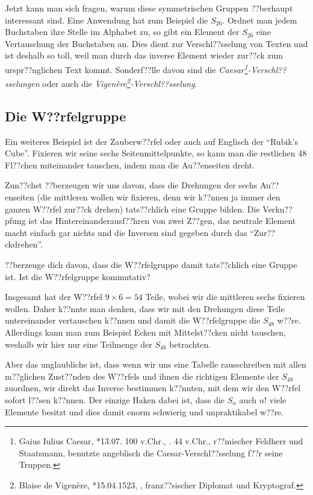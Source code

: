 \documentclass[a4paper,ngerman,12pt]{zirkelblatt1415}
\theoremstyle{definition}
\theoremstyle{plain}
\theoremstyle{remark}
\begin{document}
Jetzt kann man sich fragen, warum diese symmetrischen Gruppen ??berhaupt interessant sind. Eine Anwendung hat zum Beispiel die $S_{26}$. Ordnet man jedem Buchstaben ihre Stelle im Alphabet zu, so gibt ein Element der $S_{26}$ eine Vertauschung der Buchstaben an. Dies dient zur Verschl??sselung von Texten und ist deshalb so toll, weil man durch das inverse Element wieder zur??ck zum urspr??nglichen Text kommt. Sonderf??lle davon sind die \textit{Caesar\footnote{Gaius Iulius Caesar, *13.07. 100 v.Chr., . 44 v.Chr., r??mischer Feldherr und Staatsmann, benutzte angeblisch die Caesar-Verschl??sselung f??r seine Truppen.}-Verschl??sselungen} oder auch die \textit{Vigen\`ere\footnote{Blaise de Vigen\`ere, *15.04.1523, , franz??sischer Diplomat und Kryptograf.}-Verschl??sselung}.

\subsection{Die W??rfelgruppe}

Ein weiteres Beispiel ist der Zauberw??rfel oder auch auf Englisch der "`Rubik's Cube"'. Fixieren wir seine sechs Seitenmittelpunkte, so kann man die restlichen 48 Fl??chen miteinander tauschen, indem man die Au??enseiten dreht.

Zun??chst ??berzeugen wir uns davon, dass die Drehungen der sechs Au??enseiten (die mittleren wollen wir fixieren, denn wir k??nnen ja immer den ganzen W??rfel zur??ck drehen) tats??chlich eine Gruppe bilden. Die Verkn??pfung ist das Hintereinanderausf??hren von zwei Z??gen, das neutrale Element macht einfach gar nichts und die Inversen sind gegeben durch das "`Zur??ckdrehen"'.

\begin{aufgabe}{}
  ??berzeuge dich davon, dass die W??rfelgruppe damit tats??chlich eine Gruppe ist. Ist die W??rfelgruppe kommutativ?
\end{aufgabe}

Insgesamt hat der W??rfel $9\times 6=54$ Teile, wobei wir die mittleren sechs fixieren wollen. Daher k??nnte man denken, dass wir mit den Drehungen diese Teile untereinander vertauschen k??nnen und damit die W??rfelgruppe die $S_{48}$ w??re. Allerdings kann man zum Beispiel Ecken mit Mittelst??cken nicht tauschen, weshalb wir hier nur eine Teilmenge der $S_{48}$ betrachten.

Aber das unglaubliche ist, dass wenn wir uns eine Tabelle rausschreiben mit allen m??glichen Zust??nden des W??rfels und ihnen die richtigen Elemente der $S_{48}$ zuordnen, wir direkt das Inverse bestimmen k??nnten, mit dem wir den W??rfel sofort l??sen k??nnen. Der einzige Haken dabei ist, dass die $S_n$ auch $n!$ viele Elemente besitzt und dies damit enorm schwierig und unpraktikabel w??re.
\end{document}

